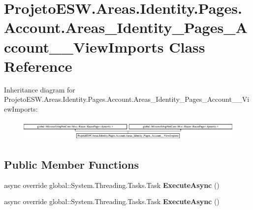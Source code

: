 \hypertarget{class_projeto_e_s_w_1_1_areas_1_1_identity_1_1_pages_1_1_account_1_1_areas___identity___pages___account_____view_imports}{}\section{Projeto\+E\+S\+W.\+Areas.\+Identity.\+Pages.\+Account.\+Areas\+\_\+\+Identity\+\_\+\+Pages\+\_\+\+Account\+\_\+\+\_\+\+View\+Imports Class Reference}
\label{class_projeto_e_s_w_1_1_areas_1_1_identity_1_1_pages_1_1_account_1_1_areas___identity___pages___account_____view_imports}
Inheritance diagram for Projeto\+E\+S\+W.\+Areas.\+Identity.\+Pages.\+Account.\+Areas\+\_\+\+Identity\+\_\+\+Pages\+\_\+\+Account\+\_\+\+\_\+\+View\+Imports\+:\begin{figure}[H]
\begin{center}
\leavevmode
\includegraphics[height=1.072797cm]{class_projeto_e_s_w_1_1_areas_1_1_identity_1_1_pages_1_1_account_1_1_areas___identity___pages___account_____view_imports}
\end{center}
\end{figure}
\subsection*{Public Member Functions}
\begin{DoxyCompactItemize}
\item 
\mbox{\label{class_projeto_e_s_w_1_1_areas_1_1_identity_1_1_pages_1_1_account_1_1_areas___identity___pages___account_____view_imports_a39e8cf1e1796ed95a9adcd67a9959ab3}} 
async override global\+::\+System.\+Threading.\+Tasks.\+Task {\bfseries Execute\+Async} ()
\item 
\mbox{\label{class_projeto_e_s_w_1_1_areas_1_1_identity_1_1_pages_1_1_account_1_1_areas___identity___pages___account_____view_imports_a39e8cf1e1796ed95a9adcd67a9959ab3}} 
async override global\+::\+System.\+Threading.\+Tasks.\+Task {\bfseries Execute\+Async} ()
\end{DoxyCompactItemize}
